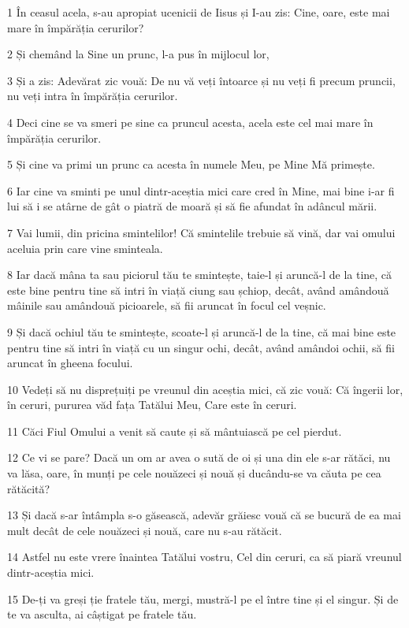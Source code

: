 \par 1 În ceasul acela, s-au apropiat ucenicii de Iisus și I-au zis: Cine, oare, este mai mare în împărăția cerurilor?
\par 2 Și chemând la Sine un prunc, l-a pus în mijlocul lor,
\par 3 Și a zis: Adevărat zic vouă: De nu vă veți întoarce și nu veți fi precum pruncii, nu veți intra în împărăția cerurilor.
\par 4 Deci cine se va smeri pe sine ca pruncul acesta, acela este cel mai mare în împărăția cerurilor.
\par 5 Și cine va primi un prunc ca acesta în numele Meu, pe Mine Mă primește.
\par 6 Iar cine va sminti pe unul dintr-aceștia mici care cred în Mine, mai bine i-ar fi lui să i se atârne de gât o piatră de moară și să fie afundat în adâncul mării.
\par 7 Vai lumii, din pricina smintelilor! Că smintelile trebuie să vină, dar vai omului aceluia prin care vine sminteala.
\par 8 Iar dacă mâna ta sau piciorul tău te smintește, taie-l și aruncă-l de la tine, că este bine pentru tine să intri în viață ciung sau șchiop, decât, având amândouă mâinile sau amândouă picioarele, să fii aruncat în focul cel veșnic.
\par 9 Și dacă ochiul tău te smintește, scoate-l și aruncă-l de la tine, că mai bine este pentru tine să intri în viață cu un singur ochi, decât, având amândoi ochii, să fii aruncat în gheena focului.
\par 10 Vedeți să nu disprețuiți pe vreunul din aceștia mici, că zic vouă: Că îngerii lor, în ceruri, pururea văd fața Tatălui Meu, Care este în ceruri.
\par 11 Căci Fiul Omului a venit să caute și să mântuiască pe cel pierdut.
\par 12 Ce vi se pare? Dacă un om ar avea o sută de oi și una din ele s-ar rătăci, nu va lăsa, oare, în munți pe cele nouăzeci și nouă și ducându-se va căuta pe cea rătăcită?
\par 13 Și dacă s-ar întâmpla s-o găsească, adevăr grăiesc vouă că se bucură de ea mai mult decât de cele nouăzeci și nouă, care nu s-au rătăcit.
\par 14 Astfel nu este vrere înaintea Tatălui vostru, Cel din ceruri, ca să piară vreunul dintr-aceștia mici.
\par 15 De-ți va greși ție fratele tău, mergi, mustră-l pe el între tine și el singur. Și de te va asculta, ai câștigat pe fratele tău.

